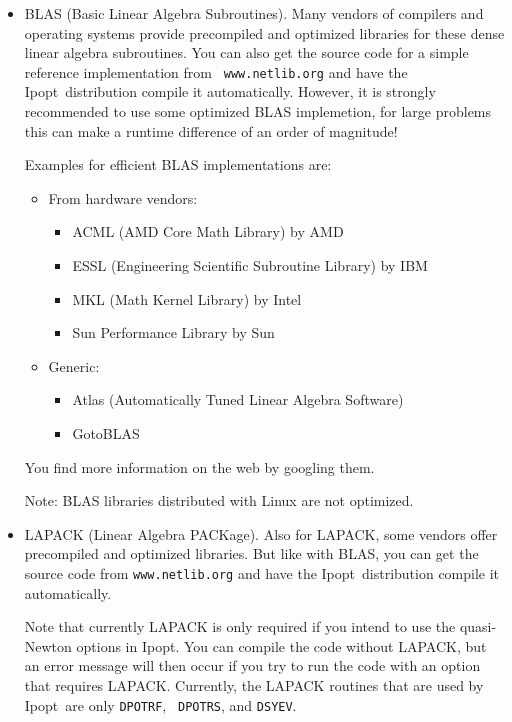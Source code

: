 \documentclass[10pt]{article}
\newcommand{\Ipopt}{{\sc Ipopt}}
\begin{document}
\begin{itemize}
\item BLAS (Basic Linear Algebra Subroutines).  Many vendors of
  compilers and operating systems provide precompiled and optimized
  libraries for these dense linear algebra subroutines.  You can also
  get the source code for a simple reference implementation from {\tt
    www.netlib.org} and have the \Ipopt\ distribution compile it
  automatically.  However, it is strongly recommended to use some
  optimized BLAS implemetion, for large problems this can make a
  runtime difference of an order of magnitude!

  Examples for efficient BLAS implementations are:
  \begin{itemize}
  \item From hardware vendors:
    \begin{itemize}
    \item ACML (AMD Core Math Library) by AMD
    \item ESSL (Engineering Scientific Subroutine Library) by IBM
    \item MKL (Math Kernel Library) by Intel
    \item Sun Performance Library by Sun
    \end{itemize}
  \item Generic:
    \begin{itemize}
    \item Atlas (Automatically Tuned Linear Algebra Software)
    \item GotoBLAS
    \end{itemize}
  \end{itemize}
  You find more information on the web by googling them.

  Note: BLAS libraries distributed with Linux are not optimized.
\item LAPACK (Linear Algebra PACKage).  Also for LAPACK, some vendors
  offer precompiled and optimized libraries.  But like with BLAS, you
  can get the source code from {\tt www.netlib.org} and have the
  \Ipopt\ distribution compile it automatically.

  Note that currently LAPACK is only required if you intend to use the
  quasi-Newton options in \Ipopt.  You can compile the code without
  LAPACK, but an error message will then occur if you try to run the
  code with an option that requires LAPACK.  Currently, the LAPACK
  routines that are used by \Ipopt\ are only {\tt DPOTRF}, {\tt
    DPOTRS}, and {\tt DSYEV}.


\end{itemize}
\end{document}
